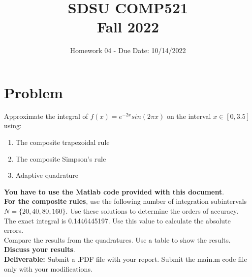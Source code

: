 \documentclass{article}
\title{SDSU COMP521 \\ Fall 2022}
\author{Homework 04 - Due Date: 10/14/2022}
\begin{document}
\newcommand{\norm}[1]{\left\lVert#1\right\rVert}
\maketitle
\section*{Problem}

Approximate the integral of $f(x)=e^{-2x}sin(2\pi x)$ on the interval $x \in [0,3.5]$ using:
\begin{enumerate}
	\item The composite trapezoidal rule
	\item The composite Simpson's rule
	\item Adaptive quadrature
\end{enumerate}
\textbf{You have to use the Matlab code provided with this document}.\\

\textbf{For the composite rules}, use the following number of integration subintervals $N=\{20,40,80,160\}$. Use these solutions to determine the orders of accuracy. The exact integral is 0.1446445197. Use this value to calculate the absolute errors.\\

Compare the results from the quadratures. Use a table to show the results.\\

\textbf{Discuss your results}.\\


\textbf{Deliverable:} Submit a .PDF file with your report. Submit the main.m code file only with your modifications.
\end{document}

